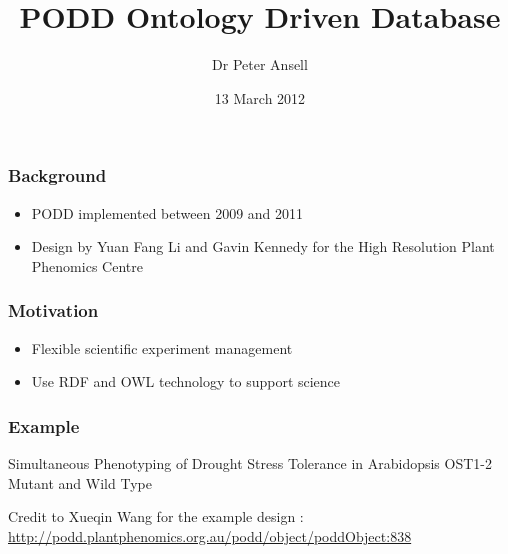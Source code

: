 \documentclass[12pt]{beamer}
\title{PODD Ontology Driven Database}
\author{Dr Peter Ansell}
\institute{University of Queensland}
\date{13 March 2012}
\begin{document}
\begin{frame}
\titlepage
\end{frame}


\begin{frame}
\frametitle{Background} 

\begin{itemize}
 \item PODD implemented between 2009 and 2011
 \item Design by Yuan Fang Li and Gavin Kennedy for the High Resolution Plant Phenomics Centre
\end{itemize}

\end{frame}

\begin{frame}
\frametitle{Motivation} 

\begin{itemize}
 \item Flexible scientific experiment management
 \item Use RDF and OWL technology to support science
\end{itemize}


\end{frame}

\begin{frame}
\frametitle{Example} 

Simultaneous Phenotyping of Drought Stress Tolerance in Arabidopsis OST1-2 Mutant and Wild Type 

\vskip 12pt


Credit to Xueqin Wang for the example design : \url{http://podd.plantphenomics.org.au/podd/object/poddObject:838}

\end{frame}

\bgroup
{}
\begin{frame}[plain]{}
\end{frame}
\egroup
\end{document}
